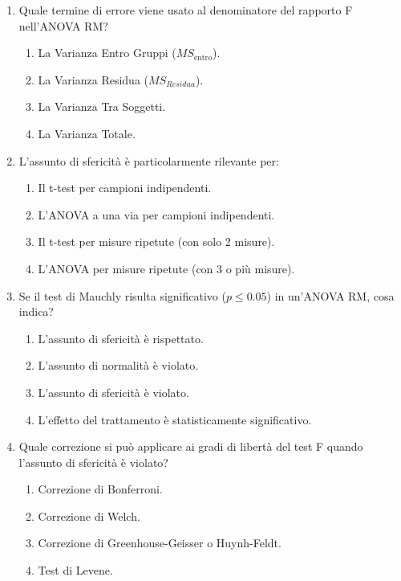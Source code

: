 \documentclass[12pt, a4paper]{article}
\newcommand{\MSw}{MS_{\text{entro}}} %
\begin{document}
\begin{enumerate}
     \item Quale termine di errore viene usato al denominatore del rapporto F nell'ANOVA RM?
    \begin{enumerate}
        \item La Varianza Entro Gruppi ($\MSw$).
        \item La Varianza Residua ($MS_{Residua}$).
        \item La Varianza Tra Soggetti.
        \item La Varianza Totale.
    \end{enumerate}

     \item L'assunto di sfericità è particolarmente rilevante per:
    \begin{enumerate}
        \item Il t-test per campioni indipendenti.
        \item L'ANOVA a una via per campioni indipendenti.
        \item Il t-test per misure ripetute (con solo 2 misure).
        \item L'ANOVA per misure ripetute (con 3 o più misure).
    \end{enumerate}

     \item Se il test di Mauchly risulta significativo ($p \le 0.05$) in un'ANOVA RM, cosa indica?
    \begin{enumerate}
        \item L'assunto di sfericità è rispettato.
        \item L'assunto di normalità è violato.
        \item L'assunto di sfericità è violato.
        \item L'effetto del trattamento è statisticamente significativo.
    \end{enumerate}

     \item Quale correzione si può applicare ai gradi di libertà del test F quando l'assunto di sfericità è violato?
    \begin{enumerate}
        \item Correzione di Bonferroni.
        \item Correzione di Welch.
        \item Correzione di Greenhouse-Geisser o Huynh-Feldt.
        \item Test di Levene.
    \end{enumerate}


\end{enumerate}
\end{document}
